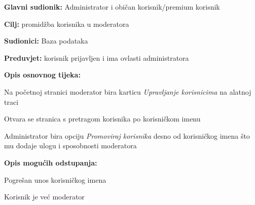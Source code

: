 					\noindent {}
					\begin{packed_item}
						
						\item \textbf{Glavni sudionik: }Administrator i običan korisnik/premium korisnik
						\item  \textbf{Cilj:} promidžba korisnika u moderatora
						\item  \textbf{Sudionici:}
						Baza podataka
						\item  \textbf{Preduvjet:} korisnik prijavljen i ima ovlasti administratora
						\item  \textbf{Opis osnovnog tijeka:}
						
						\item[] \begin{packed_enum}
							
							\item	Na početnoj stranici moderator bira karticu \textit{Upravljanje korisnicima} na alatnoj traci
							\item	Otvara se stranica s pretragom korisnika po korisničkom imenu
							\item	Administrator bira opciju \textit{Promoviraj korisnika} desno od korisničkog imena što mu dodaje ulogu i sposobnosti moderatora
							
						\end{packed_enum}
						
						\item  \textbf{Opis mogućih odstupanja:}
						
						\item[] \begin{packed_item}
							
							\item[2.a] Pogrešan unos korisničkog imena
							\item[3.a] Korisnik je već moderator
							
						\end{packed_item}
					\end{packed_item}
					
